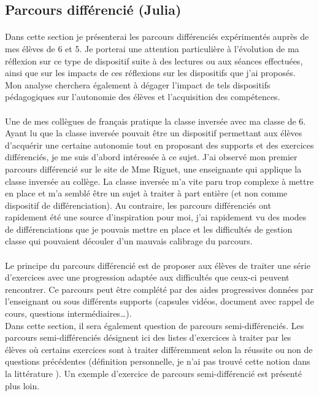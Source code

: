 \subsection{Parcours différencié (Julia)}
\paragraph{} Dans cette section je présenterai les parcours différenciés expérimentés auprès de mes élèves de 6 et 5. Je porterai une attention particulière à l'évolution de ma réflexion sur ce type de dispositif suite à des lectures ou aux séances effectuées, ainsi que sur les impacts de ces réflexions sur les dispositifs que j'ai proposés. Mon analyse cherchera également à dégager l'impact de tels dispositifs pédagogiques sur l'autonomie des élèves et l'acquisition des compétences.
\paragraph{}Une de mes collègues de français pratique la classe inversée avec ma classe de 6. Ayant lu que la classe inversée\cite{cnesco_Lafontaine}\cite{cnesco_notes_experts} pouvait être un dispositif permettant aux élèves d'acquérir une certaine autonomie tout en proposant des supports et des exercices différenciés, je me suis d'abord intéressée à ce sujet. J'ai observé mon premier parcours différencié sur le site de Mme Riguet\cite{riguet}, une enseignante qui applique la classe inversée au collège. La classe inversée m'a vite paru trop complexe à mettre en place et m'a semblé être un sujet à traiter à part entière (et non comme dispositif de différenciation). Au contraire, les parcours différenciés ont rapidement été une source d'inspiration pour moi, j'ai rapidement vu des modes de différenciations que je pouvais mettre en place et les difficultés de gestion classe qui pouvaient découler d'un mauvais calibrage du parcours.
\paragraph{}Le principe du parcours différencié est de proposer aux élèves de traiter une série d'exercices avec une progression adaptée aux difficultés que ceux-ci peuvent rencontrer. Ce parcours peut être complété par des aides progressives données par l'enseignant ou sous différents supports (capsules vidéos, document avec rappel de cours, questions intermédiaires\ldots ). \\
Dans cette section, il sera également question de parcours semi-différenciés. Les parcours semi-différenciés désignent ici des listes d'exercices à traiter par les élèves où certains exercices sont à traiter différemment selon la réussite ou non de questions précédentes (définition personnelle, je n'ai pas trouvé cette notion dans la littérature ). Un exemple d'exercice de parcours semi-différencié est présenté plus loin.
